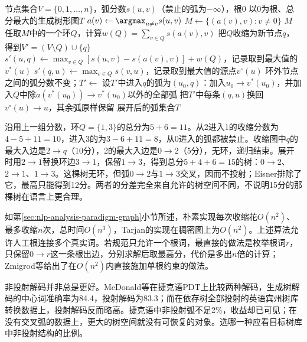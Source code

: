 \begin{algorithm}
  \label{alg:nlp-analysis-cle}
  \begin{algorithmic}[1]
    \Require 节点集合$V=\{0,1,\ldots,n\}$，弧分数$s(u,v)$（禁止的弧为$-\infty$），根0
    \Ensure 以0为根、总分最大的生成树形图$T$
        \State $a(v)\gets\argmax_{u\neq v}s(u,v)$
      \EndFor
      \State $M\gets\{(a(v),v):v\neq0\}$
        \State \Return $M$
      \EndIf
      \State 任取$M$中的一个环$Q$，计算$w(Q)=\sum_{v\in Q}s(a(v),v)$
      \State 把$Q$收缩为新节点$q$，得到$V'=(V\setminus Q)\cup\{q\}$
        \State $s'(u,q)\gets\max_{v\in Q}[s(u,v)-s(a(v),v)]+w(Q)$，记录取到最大值的$v^\ast(u)$
        \State $s'(q,u)\gets\max_{v\in Q}s(v,u)$，记录取到最大值的源点$v^{\circ}(u)$
      \EndFor
      \State 环外节点之间的弧分数不变；$T'\gets$
      \State 设$T'$中进入$q$的弧为$(u_0,q)$：加入$u_0\to v^\ast(u_0)$，并加入$Q$中除$a(v^\ast(u_0))\to v^\ast(u_0)$以外的全部弧
      \State 把$T'$中每条$(q,u)$换回$v^{\circ}(u)\to u$，其余弧原样保留
      \State \Return 展开后的弧集合$T$
    \EndProcedure
  \end{algorithmic}
\end{algorithm}

沿用上一组分数，环$Q=\{1,3\}$的总分为$5+6=11$。从2进入1的收缩分数为$4-5+11=10$，进入3的为$3-6+11=8$，从0进入的弧都被禁止。收缩图中$q$的最大入边是$2\to q$（10分），2的最大入边是$0\to2$（5分），无环，递归结束。展开时用$2\to1$替换环边$3\to1$，保留$1\to3$，得到总分$5+4+6=15$的树：$0\to2$、$2\to1$、$1\to3$。这棵树无环，但弧$0\to2$与$1\to3$交叉，因而不投射；Eisner排除了它，最高只能得到12分。两者的分差完全来自允许的树空间不同，不说明15分的那棵树在语言上更合理。

如第\ref{sec:nlp-analysis-paradigm-graph}小节所述，朴素实现每次收缩花$O(n^2)$、最多收缩$n$次，总时间$O(n^3)$，Tarjan的实现在稠密图上为$O(n^2)$。上述算法允许人工根连接多个真实词。若规范只允许一个根词，最直接的做法是枚举根词$r$，只保留$0\to r$这一条根出边，分别求解后取最高分，代价是多出$n$倍的计算；Zmigrod等给出了在$O(n^2)$内直接施加单根约束的做法。

非投射解码并非总是更好。McDonald等在捷克语PDT上比较两种解码，生成树解码的中心词准确率为84.4，投射解码为83.3；而在依存树全部投射的英语宾州树库转换数据上，投射解码反而略高。捷克语中非投射弧不足2\%，收益却已可见；在没有交叉弧的数据上，更大的树空间就没有可恢复的对象。选哪一种应看目标树库中非投射结构的比例。

